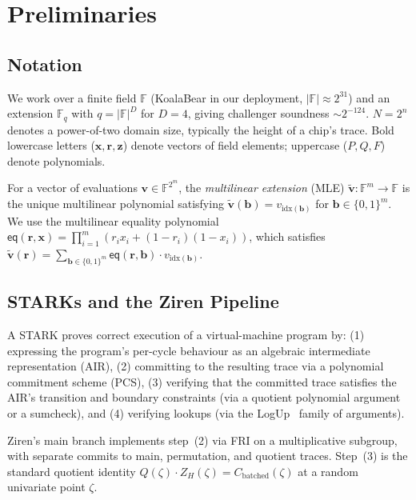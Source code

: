 \section{Preliminaries}
\label{sec:preliminaries}

\subsection{Notation}

We work over a finite field $\mathbb{F}$ (KoalaBear in our deployment,
$|\mathbb{F}| \approx 2^{31}$) and an extension $\mathbb{F}_q$ with
$q = |\mathbb{F}|^D$ for $D=4$, giving challenger soundness
$\sim 2^{-124}$.  $N = 2^n$ denotes a power-of-two domain size,
typically the height of a chip's trace.  Bold lowercase letters
($\mathbf{x}, \mathbf{r}, \mathbf{z}$) denote vectors of field
elements; uppercase ($P, Q, F$) denote polynomials.

For a vector of evaluations $\mathbf{v} \in \mathbb{F}^{2^m}$, the
\emph{multilinear extension} (MLE) $\widetilde{\mathbf{v}}:
\mathbb{F}^m \to \mathbb{F}$ is the unique multilinear polynomial
satisfying $\widetilde{\mathbf{v}}(\mathbf{b}) = v_{\mathrm{idx}
(\mathbf{b})}$ for $\mathbf{b} \in \{0,1\}^m$.  We use the
multilinear equality polynomial $\mathsf{eq}(\mathbf{r}, \mathbf{x})
= \prod_{i=1}^{m} (r_i x_i + (1-r_i)(1-x_i))$, which satisfies
$\widetilde{\mathbf{v}}(\mathbf{r}) = \sum_{\mathbf{b} \in \{0,1\}^m}
\mathsf{eq}(\mathbf{r}, \mathbf{b}) \cdot v_{\mathrm{idx}(\mathbf{b})}$.

\subsection{STARKs and the Ziren Pipeline}

A STARK proves correct execution of a virtual-machine program by:
(1) expressing the program's per-cycle behaviour as an algebraic
intermediate representation (AIR), (2) committing to the resulting
trace via a polynomial commitment scheme (PCS), (3) verifying that
the committed trace satisfies the AIR's transition and boundary
constraints (via a quotient polynomial argument or a sumcheck),
and (4) verifying lookups (via the LogUp~\cite{logup-gkr} family of
arguments).

Ziren's main branch implements step~(2) via FRI on a multiplicative
subgroup, with separate commits to main, permutation, and quotient
traces.  Step~(3) is the standard quotient identity
$Q(\zeta) \cdot Z_H(\zeta) = C_{\mathrm{batched}}(\zeta)$ at a
random univariate point $\zeta$.

